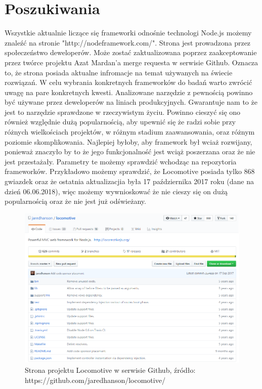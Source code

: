 \documentclass[12pt]{report}
\begin{document}
  \section{Poszukiwania}
    Wszystkie aktualnie liczące się frameworki odnośnie technologi Node.js możemy znaleźć na stronie "http://nodeframework.com/".
    Strona jest prowadzona przez społeczeństwo deweloperów.
    Może zostać zaktualizowana poprzez zaakceptowanie przez twórce projektu Azat Mardan'a merge requesta w serwisie Github.
    Oznacza to, że strona posiada aktualne infromacje na temat używanych na świecie rozwiązań.
    W celu wybrania konkretnych frameworków do badań warto zwrócić uwagę na pare konkretnych kwesti.
    Analizowane narzędzie z pewnością powinno być używane przez deweloperów na liniach produkcyjnych.
    Gwarantuje nam to że jest to narzędzie sprawdzone w rzeczywistym życiu.
    Powinno cieszyć się ono również względnie dużą popularnością, aby upewnić się że radzi sobie przy różnych wielkościach projektów, w różnym stadium zaawansowania, oraz różnym poziomie skomplikowania.
    Najlepiej byłoby, aby framework był wciaż rozwijany, ponieważ znaczyło by to że jego funkcjonalność jest wciąż poszerzana oraz że nie jest przestażały.
    Parametry te możemy sprawdzić wchodząc na repozytoria frameworków.
    Przykładowo możemy sprawdzić, że Locomotive posiada tylko 868 gwiazdek oraz że ostatnia aktualizacjia była 17 października 2017 roku (dane na dzień 06.06.2018), więc możemy wywnioskować że nie cieszy się on dużą popularnością oraz że nie jest już odświeżany.
    \begin{figure}[!hb]
      \centering
      \includegraphics[width=\textwidth,height=\textheight,keepaspectratio]{locomotive.png} 
      \caption{Strona projektu Locomotive w serwisie Github, źródło: https://github.com/jaredhanson/locomotive/}
    \end{figure}
\end{document}

